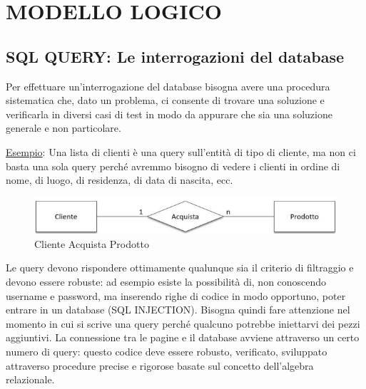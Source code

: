 
\chapter{MODELLO LOGICO}
\label{cap:logical}

\section{SQL QUERY: Le interrogazioni del database}

Per effettuare un'interrogazione del database bisogna avere una procedura sistematica che, dato un problema, ci consente di trovare una soluzione e verificarla in diversi casi di test in modo da appurare che sia una soluzione generale e non particolare.  

\underline{Esempio}: Una lista di clienti è una query sull'entità di tipo di cliente, ma non ci basta una sola query perché avremmo bisogno di vedere i clienti in ordine di nome, di luogo, di residenza, di data di nascita, ecc.   

\begin{center}
\begin{figure}[H]
\centering
\includegraphics[scale=0.8]{figures/cliente_acquista_prodotto.png}
\caption{Cliente Acquista Prodotto} 
\end{figure}
\end{center}

Le query devono rispondere ottimamente qualunque sia il criterio di filtraggio e devono essere robuste: ad esempio esiste la possibilità di, non conoscendo username e password, ma inserendo righe di codice in modo opportuno, poter entrare in un database (SQL INJECTION). Bisogna quindi fare attenzione nel momento in cui si scrive una query perché qualcuno potrebbe iniettarvi dei pezzi aggiuntivi. La connessione tra le pagine e il database avviene attraverso un certo numero di query: questo codice deve essere robusto, verificato, sviluppato attraverso procedure precise e rigorose basate sul concetto dell'algebra relazionale. 

